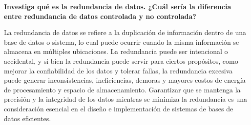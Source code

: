 \begin{center}
\textbf{Investiga qué es la redundancia de datos. ¿Cuál sería la diferencia entre redundancia de datos
controlada y no controlada?}\\
\end{center} 


La redundancia de datos se refiere a la duplicación de información dentro de una base de datos o sistema, lo cual puede ocurrir cuando la misma información se almacena en múltiples ubicaciones. La redundancia puede ser intencional o accidental, y si bien la redundancia puede servir para ciertos propósitos, como mejorar la confiabilidad de los datos y tolerar fallas, la redundancia excesiva puede generar inconsistencias, ineficiencias, demoras y mayores costos de energía de procesamiento y espacio de almacenamiento. Garantizar que se mantenga la precisión y la integridad de los datos mientras se minimiza la redundancia es una consideración esencial en el diseño e implementación de sistemas de bases de datos eficientes.\\

